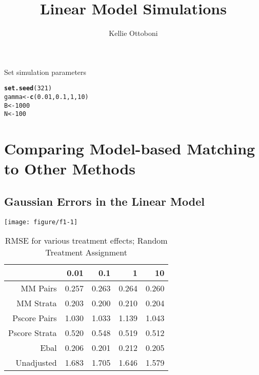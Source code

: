 \documentclass[11pt]{article}\usepackage[]{graphicx}\usepackage[]{color}
\title{Linear Model Simulations}
\author{Kellie Ottoboni}
\makeatletter
\def\maxwidth{ %
  \ifdim\Gin@nat@width>\linewidth
    \linewidth
  \else
    \Gin@nat@width
  \fi
}
\newcommand{\hlnum}[1]{\textcolor[rgb]{0.686,0.059,0.569}{#1}}%
\newcommand{\hlstd}[1]{\textcolor[rgb]{0.345,0.345,0.345}{#1}}%
\newcommand{\hlkwb}[1]{\textcolor[rgb]{0.69,0.353,0.396}{#1}}%
\newcommand{\hlkwd}[1]{\textcolor[rgb]{0.737,0.353,0.396}{\textbf{#1}}}%
\newenvironment{kframe}{%
 \def\at@end@of@kframe{}%
 \ifinner\ifhmode%
  \def\at@end@of@kframe{\end{minipage}}%
  \begin{minipage}{\columnwidth}%
 \fi\fi%
 \def\FrameCommand##1{\hskip\@totalleftmargin \hskip-\fboxsep
 \colorbox{shadecolor}{##1}\hskip-\fboxsep
     \hskip-\linewidth \hskip-\@totalleftmargin \hskip\columnwidth}%
 \MakeFramed {\advance\hsize-\width
   \@totalleftmargin\z@ \linewidth\hsize
   \@setminipage}}%
 {\par\unskip\endMakeFramed%
 \at@end@of@kframe}
\newenvironment{knitrout}{}{} %
\makeatother
\begin{document}
\maketitle


Set simulation parameters
\begin{knitrout}
\color{fgcolor}\begin{kframe}
\begin{alltt}
\hlkwd{set.seed}\hlstd{(}\hlnum{321}\hlstd{)}
\hlstd{gamma} \hlkwb{<-} \hlkwd{c}\hlstd{(}\hlnum{0.01}\hlstd{,} \hlnum{0.1}\hlstd{,} \hlnum{1}\hlstd{,} \hlnum{10}\hlstd{)}
\hlstd{B} \hlkwb{<-} \hlnum{1000}
\hlstd{N} \hlkwb{<-} \hlnum{100}
\end{alltt}
\end{kframe}
\end{knitrout}

\section{Comparing Model-based Matching to Other Methods}
\subsection{Gaussian Errors in the Linear Model}
\begin{knitrout}
\color{fgcolor}

{\centering \texttt{[image: figure/f1-1]} 

}



\end{knitrout}
\begin{table}[ht]
\centering
\begin{tabular}{rrrrr}
  \hline
 & 0.01 & 0.1 & 1 & 10 \\ 
  \hline
MM Pairs & 0.257 & 0.263 & 0.264 & 0.260 \\ 
  MM Strata & 0.203 & 0.200 & 0.210 & 0.204 \\ 
  Pscore Pairs & 1.030 & 1.033 & 1.139 & 1.043 \\ 
  Pscore Strata & 0.520 & 0.548 & 0.519 & 0.512 \\ 
  Ebal & 0.206 & 0.201 & 0.212 & 0.205 \\ 
  Unadjusted & 1.683 & 1.705 & 1.646 & 1.579 \\ 
   \hline
\end{tabular}
\caption{RMSE for various treatment effects; Random Treatment Assignment} 
\label{tab:f1}
\end{table}
\end{document}
